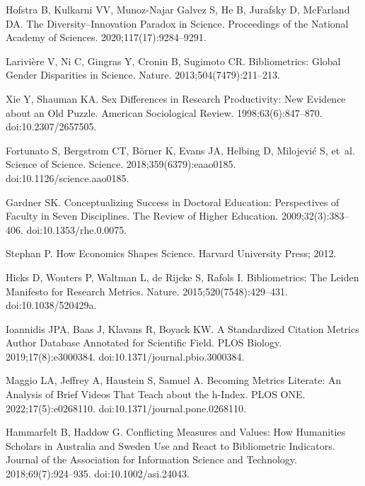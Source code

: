 \documentclass[
  10pt,
  letterpaper,
]{article}
\begin{document}
\renewcommand{\bibsection}{}
\begin{thebibliography}{10}

Hofstra B, Kulkarni VV, {Munoz-Najar Galvez} S, He B, Jurafsky D, McFarland DA.
\newblock The Diversity--Innovation Paradox in Science.
\newblock Proceedings of the National Academy of Sciences. 2020;117(17):9284--9291.

Larivi{\`e}re V, Ni C, Gingras Y, Cronin B, Sugimoto CR.
\newblock Bibliometrics: {{Global}} Gender Disparities in Science.
\newblock Nature. 2013;504(7479):211--213.

Xie Y, Shauman KA.
\newblock Sex {{Differences}} in {{Research Productivity}}: {{New Evidence}} about an {{Old Puzzle}}.
\newblock American Sociological Review. 1998;63(6):847--870.
\newblock doi:{10.2307/2657505}.

Fortunato S, Bergstrom CT, B{\"o}rner K, Evans JA, Helbing D, Milojevi{\'c} S, et~al.
\newblock Science of Science.
\newblock Science. 2018;359(6379):eaao0185.
\newblock doi:{10.1126/science.aao0185}.

Gardner SK.
\newblock Conceptualizing {{Success}} in {{Doctoral Education}}: {{Perspectives}} of {{Faculty}} in {{Seven Disciplines}}.
\newblock The Review of Higher Education. 2009;32(3):383--406.
\newblock doi:{10.1353/rhe.0.0075}.

Stephan P.
\newblock How Economics Shapes Science.
\newblock Harvard University Press; 2012.

Hicks D, Wouters P, Waltman L, {de Rijcke} S, Rafols I.
\newblock Bibliometrics: {{The Leiden Manifesto}} for Research Metrics.
\newblock Nature. 2015;520(7548):429--431.
\newblock doi:{10.1038/520429a}.

Ioannidis JPA, Baas J, Klavans R, Boyack KW.
\newblock A Standardized Citation Metrics Author Database Annotated for Scientific Field.
\newblock PLOS Biology. 2019;17(8):e3000384.
\newblock doi:{10.1371/journal.pbio.3000384}.

Maggio LA, Jeffrey A, Haustein S, Samuel A.
\newblock Becoming Metrics Literate: {{An}} Analysis of Brief Videos That Teach about the h-Index.
\newblock PLOS ONE. 2022;17(5):e0268110.
\newblock doi:{10.1371/journal.pone.0268110}.

Hammarfelt B, Haddow G.
\newblock Conflicting Measures and Values: {{How}} Humanities Scholars in {{Australia}} and {{Sweden}} Use and React to Bibliometric Indicators.
\newblock Journal of the Association for Information Science and Technology. 2018;69(7):924--935.
\newblock doi:{10.1002/asi.24043}.


\end{thebibliography}
\end{document}
